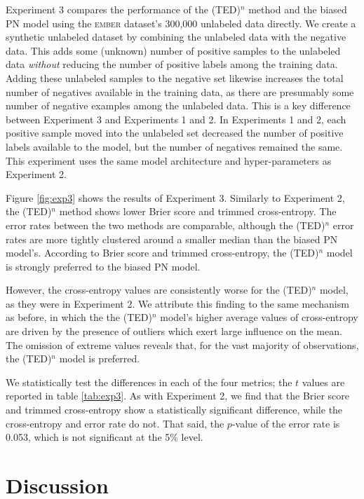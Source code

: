 \documentclass[conference]{IEEEtran}
\begin{document}
    Experiment 3 compares the performance of the (TED)${}^n$ method and the biased PN model using the \textsc{ember} dataset's 300,000 unlabeled data directly. We create a synthetic unlabeled dataset by combining the unlabeled data with the negative data. This adds some (unknown) number of positive samples to the unlabeled data \textit{without} reducing the number of positive labels among the training data. Adding these unlabeled samples to the negative set likewise increases the total number of negatives available in the training data, as there are presumably some number of negative examples among the unlabeled data. This is a key difference between Experiment 3 and Experiments 1 and 2. In Experiments 1 and 2, each positive sample moved into the unlabeled set decreased the number of positive labels available to the model, but the number of negatives remained the same. This experiment uses the same model architecture and hyper-parameters as Experiment 2.

    Figure \ref{fig:exp3} shows the results of Experiment 3. Similarly to Experiment 2, the (TED)${}^n$ method shows lower Brier score and trimmed cross-entropy. The error rates between the two methods are comparable, although the (TED)${}^n$ error rates are more tightly clustered around a smaller median than the biased PN model's. According to Brier score and trimmed cross-entropy, the (TED)${}^n$ model is strongly preferred to the biased PN model.

    However, the cross-entropy values are consistently worse for the (TED)${}^n$ model, as they were in Experiment 2. We attribute this finding to the same mechanism as before, in which the the (TED)${}^n$ model's higher average values of cross-entropy are driven by the presence of outliers which exert large influence on the mean. The omission of extreme values reveals that, for the vast majority of observations, the (TED)${}^n$ model is preferred.

    We statistically test the differences in each of the four metrics; the $t$ values are reported in table \ref{tab:exp3}. As with Experiment 2, we find that the Brier score and trimmed cross-entropy show a statistically significant difference, while the cross-entropy and error rate do not. That said, the $p$-value of the error rate is 0.053, which is not significant at the 5\% level.

\section{Discussion}
\label{sec:discuss}
\end{document}
